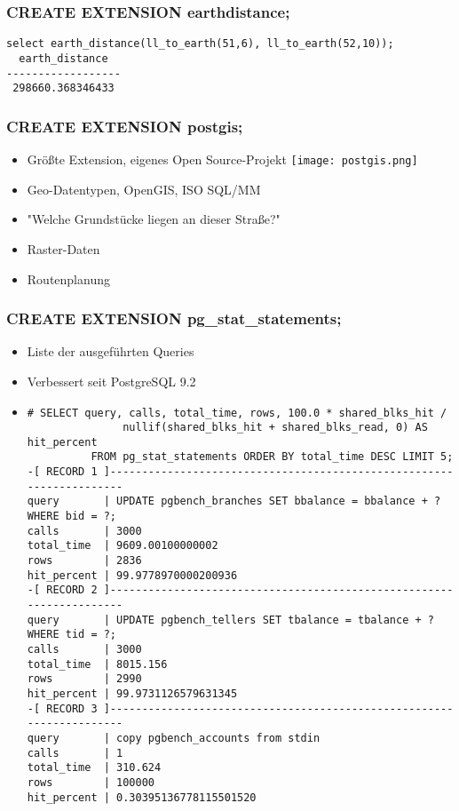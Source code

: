 \documentclass[utf8,hyperref={pdftex,colorlinks,linkcolor=black,citecolor=black,urlcolor=black,filecolor=black,plainpages=false},xcolor=table,hyperref]{beamer}
\begin{document}
\begin{frame}[containsverbatim]
	\frametitle{CREATE EXTENSION earthdistance;}
	\begin{verbatim}
select earth_distance(ll_to_earth(51,6), ll_to_earth(52,10));
  earth_distance  
------------------
 298660.368346433
 \end{verbatim}
\end{frame}

\begin{frame}[containsverbatim]
	\frametitle{CREATE EXTENSION postgis;}
	\begin{itemize}
		\item Größte Extension, eigenes Open Source-Projekt
			\texttt{[image: postgis.png]}
		\item Geo-Datentypen, OpenGIS, ISO SQL/MM
		\item "Welche Grundstücke liegen an dieser Straße?"
		\item Raster-Daten
		\item Routenplanung
	\end{itemize}
\end{frame}

\begin{frame}[containsverbatim]
	\frametitle{CREATE EXTENSION pg_stat_statements;}
	\begin{itemize}
		\item Liste der ausgeführten Queries
		\item Verbessert seit PostgreSQL 9.2
		\item \scriptsize \begin{verbatim}
# SELECT query, calls, total_time, rows, 100.0 * shared_blks_hit /
               nullif(shared_blks_hit + shared_blks_read, 0) AS hit_percent
          FROM pg_stat_statements ORDER BY total_time DESC LIMIT 5;
-[ RECORD 1 ]---------------------------------------------------------------------
query       | UPDATE pgbench_branches SET bbalance = bbalance + ? WHERE bid = ?;
calls       | 3000
total_time  | 9609.00100000002
rows        | 2836
hit_percent | 99.9778970000200936
-[ RECORD 2 ]---------------------------------------------------------------------
query       | UPDATE pgbench_tellers SET tbalance = tbalance + ? WHERE tid = ?;
calls       | 3000
total_time  | 8015.156
rows        | 2990
hit_percent | 99.9731126579631345
-[ RECORD 3 ]---------------------------------------------------------------------
query       | copy pgbench_accounts from stdin
calls       | 1
total_time  | 310.624
rows        | 100000
hit_percent | 0.30395136778115501520
\end{verbatim}
\end{itemize}
\end{frame}
\end{document}

